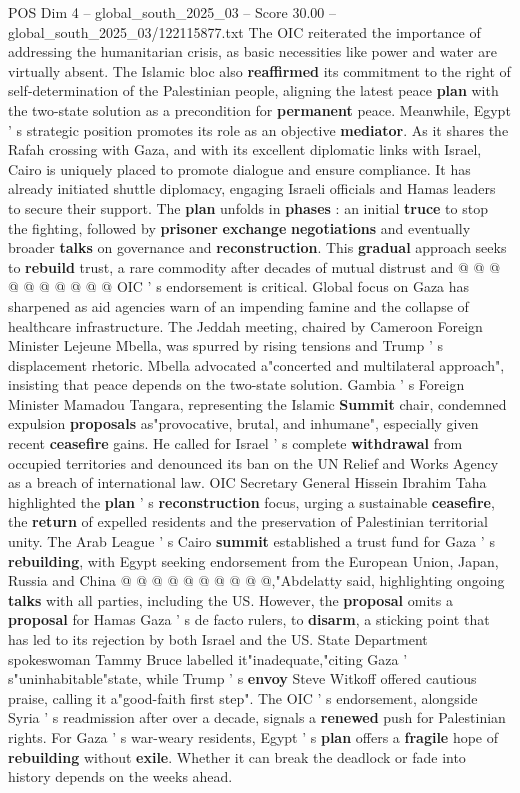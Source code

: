 \begin{textsample}{POS Dim 4 – global\_south\_2025\_03 – Score 30.00 – global\_south\_2025\_03/122115877.txt}
The OIC reiterated the importance of addressing the humanitarian crisis, as basic necessities like power and water are virtually absent.
The Islamic bloc also \textbf{reaffirmed} its commitment to the right of self-determination of the Palestinian people, aligning the latest peace \textbf{plan} with the two-state solution as a precondition for \textbf{permanent} peace.
Meanwhile, Egypt ' s strategic position promotes its role as an objective \textbf{mediator}.
As it shares the Rafah crossing with Gaza, and with its excellent diplomatic links with Israel, Cairo is uniquely placed to promote dialogue and ensure compliance.
It has already initiated shuttle diplomacy, engaging Israeli officials and Hamas leaders to secure their support.
The \textbf{plan} unfolds in \textbf{phases} : an initial \textbf{truce} to stop the fighting, followed by \textbf{prisoner} \textbf{exchange} \textbf{negotiations} and eventually broader \textbf{talks} on governance and \textbf{reconstruction}.
This \textbf{gradual} approach seeks to \textbf{rebuild} trust, a rare commodity after decades of mutual distrust and @ @ @ @ @ @ @ @ @ @ OIC ' s endorsement is critical.
Global focus on Gaza has sharpened as aid agencies warn of an impending famine and the collapse of healthcare infrastructure.
The Jeddah meeting, chaired by Cameroon Foreign Minister Lejeune Mbella, was spurred by rising tensions and Trump ' s displacement rhetoric.
Mbella advocated a"concerted and multilateral approach", insisting that peace depends on the two-state solution.
Gambia ' s Foreign Minister Mamadou Tangara, representing the Islamic \textbf{Summit} chair, condemned expulsion \textbf{proposals} as"provocative, brutal, and inhumane", especially given recent \textbf{ceasefire} gains.
He called for Israel ' s complete \textbf{withdrawal} from occupied territories and denounced its ban on the UN Relief and Works Agency as a breach of international law.
OIC Secretary General Hissein Ibrahim Taha highlighted the \textbf{plan} ' s \textbf{reconstruction} focus, urging a sustainable \textbf{ceasefire}, the \textbf{return} of expelled residents and the preservation of Palestinian territorial unity.
The Arab League ' s Cairo \textbf{summit} established a trust fund for Gaza ' s \textbf{rebuilding}, with Egypt seeking endorsement from the European Union, Japan, Russia and China @ @ @ @ @ @ @ @ @ @,"Abdelatty said, highlighting ongoing \textbf{talks} with all parties, including the US.
However, the \textbf{proposal} omits a \textbf{proposal} for Hamas Gaza ' s de facto rulers, to \textbf{disarm}, a sticking point that has led to its rejection by both Israel and the US.
State Department spokeswoman Tammy Bruce labelled it"inadequate,"citing Gaza ' s"uninhabitable"state, while Trump ' s \textbf{envoy} Steve Witkoff offered cautious praise, calling it a"good-faith first step".
The OIC ' s endorsement, alongside Syria ' s readmission after over a decade, signals a \textbf{renewed} push for Palestinian rights.
For Gaza ' s war-weary residents, Egypt ' s \textbf{plan} offers a \textbf{fragile} hope of \textbf{rebuilding} without \textbf{exile}.
Whether it can break the deadlock or fade into history depends on the weeks ahead.


\end{textsample}
